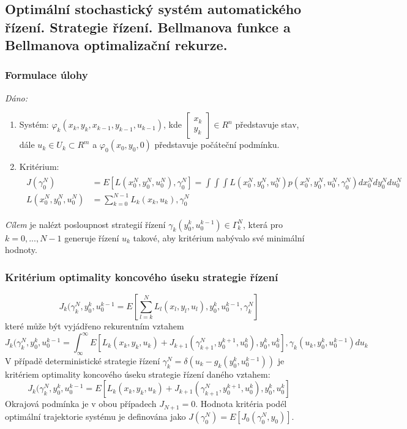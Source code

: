 \subsection{Optimální stochastický systém automatického řízení. Strategie řízení. Bellmanova funkce a Bellmanova optimalizační rekurze.}
\subsubsection*{Formulace úlohy}
\textit{Dáno:}
\begin{enumerate}
\item Systém: $ \varphi_{k}(x_k, y_k, x_{k-1}, y_{k-1}, u_{k-1}) $, kde $ \begin{bmatrix} x_k \\ y_k \end{bmatrix} \in R^n $ představuje stav, dále $ u_k \in U_k \subset R^m $ a $ \varphi_0(x_0, y_0, 0) $ představuje počáteční podmínku.
\item Kritérium:
\begin{align*}
\begin{split}
J(\gamma_0^N) &= E \left[ L(x_0^N, y_0^N, u_0^N), \gamma_0^N \right] = \int \int \int L(x_0^N, y_0^N, u_0^N) p(x_0^N, y_0^N, u_0^N, \gamma_0^N) dx_0^N dy_0^N du_0^N \\
L(x_0^N, y_0^N, u_0^N) & = \displaystyle{\sum_{k=0}^{N-1}} L_k(x_k, u_k), \gamma_0^N
\end{split}
\end{align*}
\end{enumerate}
\textit{Cílem} je nalézt posloupnost strategií řízení $ \gamma_k(y_0^k, u_0^{k-1}) \in \Gamma_k^N $, která pro $ k=0,...,N-1 $ generuje řízení $ u_k $ takové, aby kritérium nabývalo své minimální hodnoty.

\subsubsection*{Kritérium optimality koncového úseku strategie řízení}
\begin{equation*}
J_k(\gamma_k^N, y_0^k, u_0^{k-1} = E \left[ \displaystyle{\sum_{l=k}^N} L_l(x_l, y_l, u_l), y_0^k, u_0^{k-1}, \gamma_k^N \right]
\end{equation*}
které může být vyjádřeno rekurentním vztahem
\begin{equation*}
J_k(\gamma_k^N, y_0^k, u_0^{k-1} = \displaystyle{\int_\infty^\infty} E \left[ L_k(x_k, y_k, u_k) + J_{k+1}(\gamma_{k+1}^N, y_0^{k+1}, u_0^{k}), y_0^k, u_0^k \right]  , \gamma_k(u_k, y_0^k, u_0^{k-1}) du_k
\end{equation*}
V případě deterministické strategie řízení $ \gamma_k^N = \delta (u_k - g_k (y_0^k, u_0^{k-1})) $ je kritériem optimality koncového úseku strategie řízení daného vztahem:
\begin{equation*}
J_k(\gamma_k^N, y_0^k, u_0^{k-1} = E \left[ L_k(x_k, y_k, u_k) + J_{k+1}(\gamma_{k+1}^N, y_0^{k+1}, u_0^{k}), y_0^k, u_0^k \right]
\end{equation*}
Okrajová podmínka je v obou případech $ J_{N+1} = 0 $. Hodnota kritéria podél optimální trajektorie systému je definována jako $ J(\gamma_0^N) = E \left[ J_0(\gamma_0^N, y_0) \right] $.

